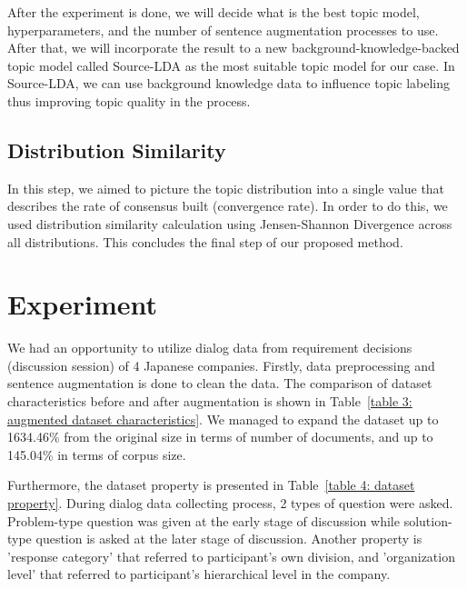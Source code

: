 \documentclass[10pt, conference, compsocconf]{IEEEtran}
\begin{document}
After the experiment is done, we will decide what is the best topic model, hyperparameters, and the number of sentence augmentation processes to use. After that, we will incorporate the result to a new background-knowledge-backed topic model called Source-LDA\cite{b9} as the most suitable topic model for our case. In Source-LDA, we can use background knowledge data to influence topic labeling thus improving topic quality in the process.

\subsection{Distribution Similarity}
In this step, we aimed to picture the topic distribution into a single value that describes the rate of consensus built (convergence rate). In order to do this, we used distribution similarity calculation using Jensen-Shannon Divergence across all distributions\cite{b10}. This concludes the final step of our proposed method.

\section{Experiment}
\label{sec_exp}
We had an opportunity to utilize dialog data from requirement decisions (discussion session) of 4 Japanese companies. Firstly, data preprocessing and sentence 
augmentation is done to clean the data. The comparison of dataset characteristics before and after augmentation is shown in Table~\ref{table 3: augmented dataset characteristics}. We managed to expand the dataset up to 1634.46\% from the original size in terms of number of documents, and up to 145.04\% in terms of corpus size. 

Furthermore, the dataset property is presented in Table~\ref{table 4: dataset property}. During dialog data collecting process, 2 types of question were asked. Problem-type question was given at the early stage of discussion while solution-type question is asked at the later stage of discussion. Another property is 'response category' that referred to participant's own division, and 'organization level' that referred to participant's hierarchical  level in the company.
\end{document}
